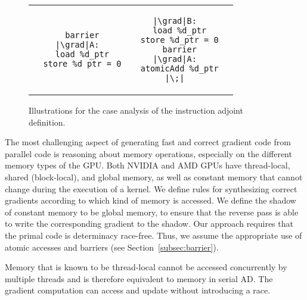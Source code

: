 \begin{figure}[hb]
\begin{tabular}{c|c|c}
\begin{minipage}[T]{0.3\linewidth}
\begin{verbatim}
  barrier
|\grad|A:
  load %d_ptr
  store %d_ptr = 0
\end{verbatim}
\end{minipage}&%
\begin{minipage}[T]{0.3\linewidth}
\begin{verbatim}
|\grad|B:
  load %d_ptr
  store %d_ptr = 0
  barrier
|\grad|A:
  atomicAdd %d_ptr
|\;|
\end{verbatim}
\end{minipage}
\end{tabular}
    \vspace*{-2mm}
    \caption{%
    Illustrations for the case analysis of the  instruction adjoint definition.
    }
    \label{fig:case_analysis}
\end{figure}

The most challenging aspect of generating fast and correct gradient code from parallel code is reasoning about memory operations,
especially on the different memory types of the GPU.
Both NVIDIA and AMD GPUs have thread-local, shared (block-local), and global memory,
as well as constant memory that cannot change during the execution of a kernel.
We define rules for synthesizing correct
gradients according to which kind of memory is accessed. 
We define the shadow of constant memory to be global memory, to ensure that the reverse pass is able to write the corresponding gradient to the shadow.
Our approach requires that the primal code is determinacy race-free. Thus, we assume the appropriate use of atomic accesses and barriers (see Section~\ref{subsec:barrier}). 

Memory that is known to be thread-local cannot be accessed concurrently by multiple threads and is therefore equivalent to memory in serial AD.
The gradient computation can access and update  without introducing a race.

